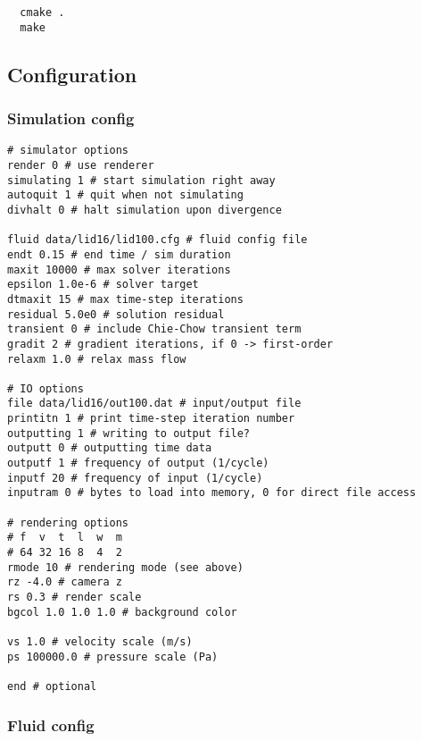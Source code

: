 \documentclass[12pt]{article}
\begin{document}
\begin{verbatim}
  cmake .
  make
\end{verbatim}

\subsection{Configuration}

\subsubsection{Simulation config}

\begin{verbatim}
# simulator options
render 0 # use renderer
simulating 1 # start simulation right away
autoquit 1 # quit when not simulating
divhalt 0 # halt simulation upon divergence

fluid data/lid16/lid100.cfg # fluid config file
endt 0.15 # end time / sim duration
maxit 10000 # max solver iterations
epsilon 1.0e-6 # solver target
dtmaxit 15 # max time-step iterations
residual 5.0e0 # solution residual
transient 0 # include Chie-Chow transient term
gradit 2 # gradient iterations, if 0 -> first-order
relaxm 1.0 # relax mass flow

# IO options
file data/lid16/out100.dat # input/output file
printitn 1 # print time-step iteration number
outputting 1 # writing to output file?
outputt 0 # outputting time data
outputf 1 # frequency of output (1/cycle)
inputf 20 # frequency of input (1/cycle)
inputram 0 # bytes to load into memory, 0 for direct file access

# rendering options
# f  v  t  l  w  m
# 64 32 16 8  4  2
rmode 10 # rendering mode (see above)
rz -4.0 # camera z
rs 0.3 # render scale
bgcol 1.0 1.0 1.0 # background color

vs 1.0 # velocity scale (m/s)
ps 100000.0 # pressure scale (Pa)

end # optional
\end{verbatim}

\subsubsection{Fluid config}
\end{document}
